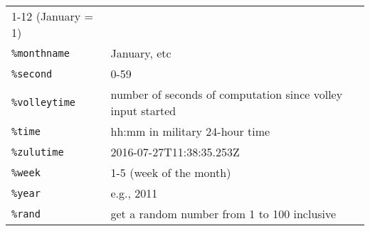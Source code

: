 \documentclass[]{article}
\begin{document}
\begin{longtable}[]{@{}ll@{}}
\begin{minipage}[t]{0.61\columnwidth}
1-12 (January = 1)\strut
\end{minipage}\tabularnewline
\begin{minipage}[t]{0.12\columnwidth}\raggedright\strut
\texttt{\%monthname}\strut
\end{minipage} & \begin{minipage}[t]{0.61\columnwidth}\raggedright\strut
January, etc\strut
\end{minipage}\tabularnewline
\begin{minipage}[t]{0.12\columnwidth}\raggedright\strut
\texttt{\%second}\strut
\end{minipage} & \begin{minipage}[t]{0.61\columnwidth}\raggedright\strut
0-59\strut
\end{minipage}\tabularnewline
\begin{minipage}[t]{0.12\columnwidth}\raggedright\strut
\texttt{\%volleytime}\strut
\end{minipage} & \begin{minipage}[t]{0.61\columnwidth}\raggedright\strut
number of seconds of computation since volley input started\strut
\end{minipage}\tabularnewline
\begin{minipage}[t]{0.12\columnwidth}\raggedright\strut
\texttt{\%time}\strut
\end{minipage} & \begin{minipage}[t]{0.61\columnwidth}\raggedright\strut
hh:mm in military 24-hour time\strut
\end{minipage}\tabularnewline
\begin{minipage}[t]{0.12\columnwidth}\raggedright\strut
\texttt{\%zulutime}\strut
\end{minipage} & \begin{minipage}[t]{0.61\columnwidth}\raggedright\strut
2016-07-27T11:38:35.253Z\strut
\end{minipage}\tabularnewline
\begin{minipage}[t]{0.12\columnwidth}\raggedright\strut
\texttt{\%week}\strut
\end{minipage} & \begin{minipage}[t]{0.61\columnwidth}\raggedright\strut
1-5 (week of the month)\strut
\end{minipage}\tabularnewline
\begin{minipage}[t]{0.12\columnwidth}\raggedright\strut
\texttt{\%year}\strut
\end{minipage} & \begin{minipage}[t]{0.61\columnwidth}\raggedright\strut
e.g., 2011\strut
\end{minipage}\tabularnewline
\begin{minipage}[t]{0.12\columnwidth}\raggedright\strut
\texttt{\%rand}\strut
\end{minipage} & \begin{minipage}[t]{0.61\columnwidth}\raggedright\strut
get a random number from 1 to 100 inclusive\strut
\end{minipage}\tabularnewline
\bottomrule
\end{longtable}
\end{document}
